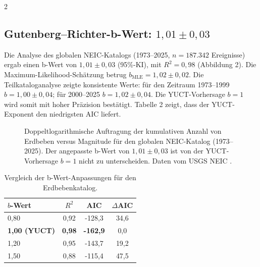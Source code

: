 \documentclass[11pt,a4paper]{article}
\begin{document}
\begin{multicols}{2}
		\subsection{Gutenberg–Richter-b-Wert: $1,01 \pm 0,03$}
		
		Die Analyse des globalen NEIC-Katalogs (1973–2025, \(n = 187.342\) Ereignisse) ergab einen b-Wert von \(1,01 \pm 0,03\) (95\%-KI), mit \(R^2 = 0,98\) (Abbildung 2). Die Maximum-Likelihood-Schätzung betrug \(b_{\text{MLE}} = 1,02 \pm 0,02\). Die Teilkataloganalyse zeigte konsistente Werte: für den Zeitraum 1973–1999 \(b = 1,00 \pm 0,04\); für 2000–2025 \(b = 1,02 \pm 0,04\). Die YUCT-Vorhersage \(b = 1\) wird somit mit hoher Präzision bestätigt. Tabelle 2 zeigt, dass der YUCT-Exponent den niedrigsten AIC liefert.
		
		\begin{figure}[htbp]
			\centering
			\caption{Doppeltlogarithmische Auftragung der kumulativen Anzahl von Erdbeben versus Magnitude für den globalen NEIC-Katalog (1973–2025). Der angepasste b-Wert von \(1,01 \pm 0,03\) ist von der YUCT-Vorhersage \(b = 1\) nicht zu unterscheiden. Daten vom USGS NEIC \cite{USGSNEIC}.}
			\label{fig:earthquakes}
		\end{figure}
		
		\begin{table}[htbp]
			\centering
			\caption{Vergleich der b-Wert-Anpassungen für den Erdbebenkatalog.}
			\label{tab:earthquakes}
			\begin{tabular}{lccc}
				\toprule
				\textbf{$b$-Wert} & $R^2$ & AIC & $\Delta$AIC \\
				\midrule
				0,80 & 0,92 & -128,3 & 34,6 \\
				\textbf{1,00 (YUCT)} & \textbf{0,98} & \textbf{-162,9} & 0,0 \\
				1,20 & 0,95 & -143,7 & 19,2 \\
				1,50 & 0,88 & -115,4 & 47,5 \\
				\bottomrule
			\end{tabular}
		\end{table}
		

\end{multicols}
\end{document}
